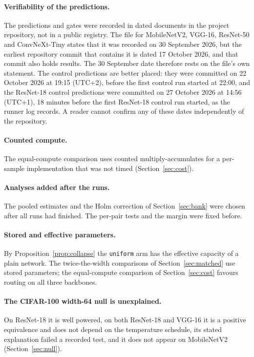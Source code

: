 \documentclass[10pt,a4paper]{article}
\begin{document}
\paragraph{Verifiability of the predictions.} The predictions and gates
were recorded in dated documents in the project repository, not in a
public registry. The file for MobileNetV2, VGG-16, ResNet-50 and ConvNeXt-Tiny
states that it was recorded on 30 September 2026, but the earliest repository
commit that contains it is dated 17 October 2026, and that commit also holds
results. The 30 September date therefore rests on the file's own statement.
The control predictions are better placed: they were committed on 22 October
2026 at 19:15 (UTC+2), before the first control run started at 22:00, and the
ResNet-18 control predictions were committed on 27 October 2026 at 14:56
(UTC+1), 18 minutes before the first ResNet-18 control run started, as the runner log
records. A reader cannot confirm any of
these dates independently of the repository.

\paragraph{Counted compute.} The equal-compute comparison uses counted
multiply-accumulates for a per-sample implementation that was not timed
(Section~\ref{sec:cost}).

\paragraph{Analyses added after the runs.} The pooled estimates and the
Holm correction of Section~\ref{sec:bank} were chosen after all runs had
finished. The per-pair tests and the margin were fixed before.

\paragraph{Stored and effective parameters.} By
Proposition~\ref{prop:collapse} the \texttt{uniform} arm has the effective
capacity of a plain network. The twice-the-width comparisons of
Section~\ref{sec:matched} use stored parameters; the equal-compute
comparison of Section~\ref{sec:cost} favours routing on all three
backbones.

\paragraph{The CIFAR-100 width-64 null is unexplained.} On ResNet-18 it is
well powered, on both ResNet-18 and VGG-16 it is a positive equivalence
and does not depend on the temperature schedule, its stated explanation
failed a recorded test, and it does not appear on MobileNetV2
(Section~\ref{sec:null}).
\end{document}
